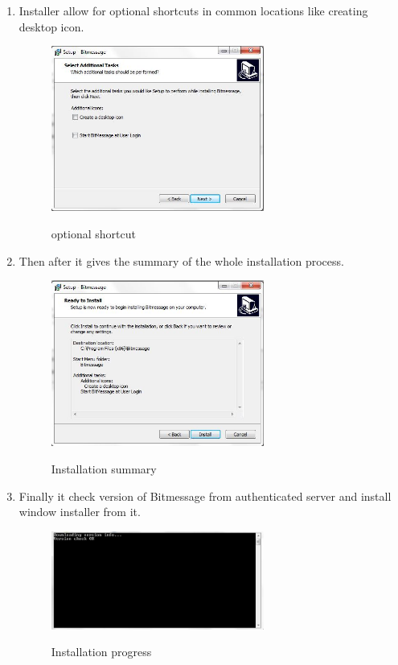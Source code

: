 \documentclass[12pt]{article}
\begin{document}
\begin{enumerate}
\begin{enumerate}
\item Installer allow for optional shortcuts in common locations like creating desktop icon.
\begin{figure}[H]
\begin{center}
    {\label{fig:1} \includegraphics[width=7cm, keepaspectratio]{SE4.jpg}}   
  \centering  \caption{optional shortcut}
  \end{center}
\end{figure}

\item  Then after it  gives the summary of the whole installation process.\\ 
\begin{figure}[H]
\begin{center}
    {\label{fig:1} \includegraphics[width=7cm, keepaspectratio]{SE5.jpg}}   
  \centering  \caption{Installation summary}
  \end{center}
\end{figure}
\item  Finally it check version of Bitmessage from authenticated server and install window installer from it.\\ 
\begin{figure}[H]
\begin{center}
    {\label{fig:1} \includegraphics[width=7cm, keepaspectratio]{SE6.jpg}}   
  \centering  \caption{Installation progress}
  \end{center}
\end{figure}







\end{enumerate}
\end{enumerate}
\end{document}
